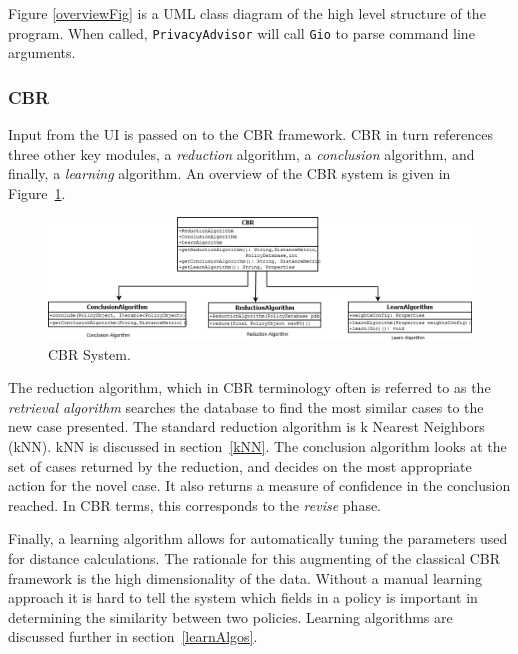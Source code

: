 Figure \ref{overviewFig} is a UML class diagram of the high level structure of the program. When called, \texttt{PrivacyAdvisor} will call \texttt{Gio} to parse command line arguments. 




\subsubsection{CBR} 
Input from the UI is passed on to the CBR framework. CBR in turn references three other key modules, a \emph{reduction} algorithm, a \emph{conclusion} algorithm, and finally, a \emph{learning} algorithm. An overview of the CBR system is given in Figure~\ref{cbr_fig}.

\begin{figure}[h!]
\begin{center}
\includegraphics[width = \textwidth]{DesignReport/uml/CBR.png}
\caption{CBR System.}
\label{cbr_fig}
\end{center}
\end{figure}

The reduction algorithm, which in CBR terminology often is referred to as the \emph{retrieval algorithm} searches the database to find the most similar cases to the new case presented. The standard reduction algorithm is k Nearest Neighbors (kNN). kNN is discussed in section~\ref{kNN}. The conclusion algorithm looks at the set of cases returned by the reduction, and decides on the most appropriate action for the novel case. It also returns a measure of confidence in the conclusion reached. In CBR terms, this corresponds to the \emph{revise} phase.

Finally, a learning algorithm allows for automatically tuning the parameters used for distance calculations. The rationale for this augmenting of the classical CBR framework is the high dimensionality of the data. Without a manual learning approach it is hard to tell the system which fields in a policy is important in determining the similarity between two policies. Learning algorithms are discussed further in section~\ref{learnAlgos}.


